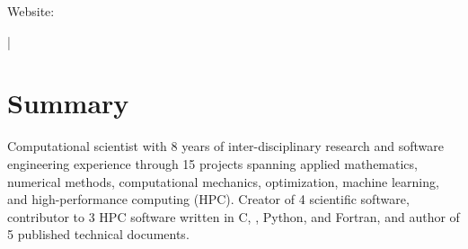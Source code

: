 \documentclass[letterpaper,10pt]{article}
\begin{document}
{\scshape\huge\Author}\vspace{2pt}

\begin{small}
  Website: \href{\AuthorWebsiteLink}{\AuthorWebsiteText}

  \vspace{2pt}\AuthorAddress

  \vspace{1pt}\href{mailto:\AuthorEmail}{\AuthorEmail} |
  \href{\AuthorPhoneLink}{\AuthorPhoneText}
\end{small}

\section{Summary}
Computational scientist with 8 years of inter-disciplinary research and
software engineering experience through 15\smallplus{} projects spanning
applied mathematics, numerical methods, computational mechanics, optimization,
machine learning, and high-performance computing (HPC). Creator of 4 scientific
software, contributor to 3 HPC software written in C, \CC{}, Python, and
Fortran, and author of 5 published technical documents.

\vspace{-182.8pt}
\end{document}
